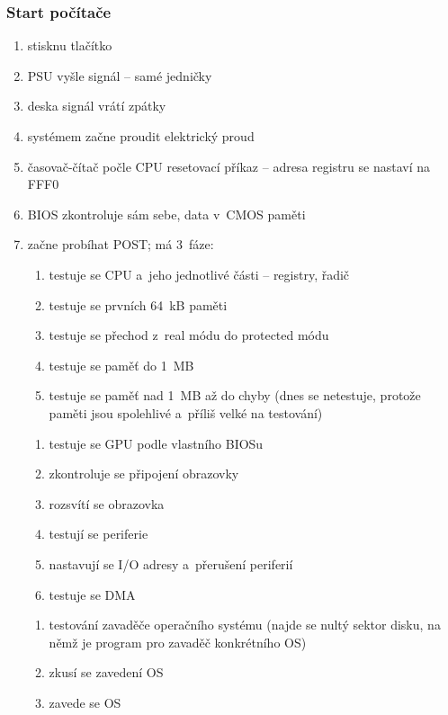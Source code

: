 \documentclass[a4paper,12pt]{article}
\newcommand*\circled[1]{\tikz[baseline=(char.base)]{
            \node[shape=circle,draw,inner sep=2pt] (char) {#1};}}
\providecommand{\tightlist}{%
\setlength{\itemsep}{0pt}\setlength{\parskip}{0pt}}
\begin{document}
\subsubsection{Start počítače}

\begin{enumerate}
  \tightlist
  \item stisknu tlačítko
  \item PSU vyšle signál -- samé jedničky
  \item deska signál vrátí zpátky
  \item systémem začne proudit elektrický proud
  \item časovač-čítač počle CPU resetovací příkaz -- adresa registru se nastaví na FFF0
  \item BIOS zkontroluje sám sebe, data v~CMOS paměti
  \item začne probíhat POST; má 3~fáze:

  \circled{1}

  \begin{enumerate}[label=\arabic*)]
    \tightlist
    \item testuje se CPU a~jeho jednotlivé části -- registry, řadič
    \item testuje se prvních 64~kB paměti
    \item testuje se přechod z~real módu do protected módu
    \item testuje se paměť do 1~MB
    \item testuje se paměť nad 1~MB až do chyby (dnes se netestuje, protože
    paměti jsou spolehlivé a~příliš velké na testování)
  \end{enumerate}

  \circled{2}

  \begin{enumerate}[label=\arabic*)]
    \tightlist
    \item testuje se GPU podle vlastního BIOSu
    \item zkontroluje se připojení obrazovky
    \item rozsvítí se obrazovka
    \item testují se periferie
    \item nastavují se I/O adresy a~přerušení periferií
    \item testuje se DMA
  \end{enumerate}

  \circled{3}

  \begin{enumerate}[label=\arabic*)]
    \tightlist
    \item testování zavaděče operačního systému (najde se nultý sektor disku, na
    němž je program pro zavaděč konkrétního OS)
    \item zkusí se zavedení OS
    \item zavede se OS
  \end{enumerate}
\end{enumerate}
\end{document}
